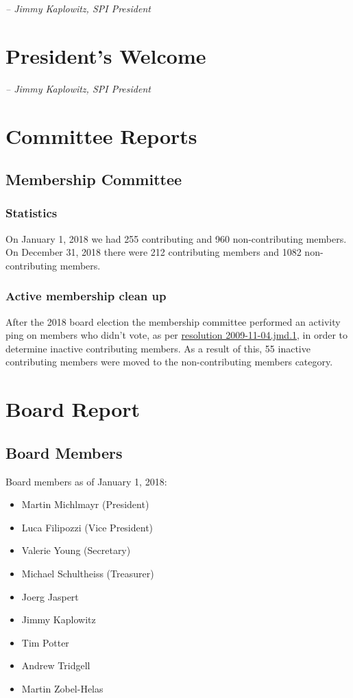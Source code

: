 \documentclass[a4paper]{report}
\begin{document}
  \emph{-- Jimmy Kaplowitz, SPI President}

\newpage

\tableofcontents

\newpage

\chapter{President's Welcome}
\label{sec:president}

  \emph{-- Jimmy Kaplowitz, SPI President}

\chapter{Committee Reports}
\section{Membership Committee}

\subsection{Statistics}

On January 1, 2018 we had 255 contributing and 960 non-contributing
members.  On December 31, 2018 there were 212 contributing members and
1082 non-contributing members.

\subsection{Active membership clean up}

After the 2018 board election the membership committee performed an
activity ping on members who didn't vote, as per
\href{https://spi-inc.org/corporate/resolutions/2009/2009-11-04.jmd.1/}{resolution
2009-11-04.jmd.1}, in order to determine inactive contributing members.
As a result of this, 55 inactive contributing members were moved to the
non-contributing members category.

\chapter{Board Report}
\section{Board Members}

Board members as of January 1, 2018:

\begin{itemize}
\item Martin Michlmayr (President)
\item Luca Filipozzi (Vice President)
\item Valerie Young (Secretary)
\item Michael Schultheiss (Treasurer)
\item Joerg Jaspert
\item Jimmy Kaplowitz
\item Tim Potter
\item Andrew Tridgell
\item Martin Zobel-Helas
\end{itemize}
\end{document}
